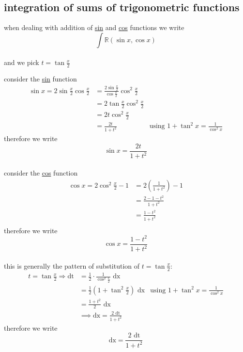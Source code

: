 \documentclass[a4paper,12pt]{article}
\newcommand{\?}{\stackrel{?}{=}}
\begin{document}
\subsection{integration of sums of trigonometric functions}
\label{sec:org50d9a5a}
\begin{definition}
\begin{note}
when dealing with addition of \hyperref[sec:org53499b5]{sin} and \hyperref[sec:org65fe77c]{cos} functions we write\\[0pt]
\[
  \int \mathbb{R}(\sin x, \cos x)
\]\\[0pt]
and we pick \(\boxed{t = \tan \frac{x}{2}}\)\\[0pt]
\end{note}
consider the \hyperref[sec:org53499b5]{sin} function\\[0pt]
\begin{align*}
  \sin x = 2\sin\frac{x}{2} \cos\frac{x}{2} &= \frac{2\sin\frac{x}{2}}{\cos\frac{x}{2}} \cos^2\frac{x}{2}\\
  &= 2\tan\frac{x}{2} \cos^2\frac{x}{2}\\
  &= 2t\cos^2\frac{x}{2}\\
  &= \frac{2t}{1 + t^2} &\text{using } 1 + \tan^2 x = \frac{1}{\cos^2 x}
\end{align*}
therefore we write\\[0pt]
\[
  \boxed{\sin x = \frac{2t}{1 + t^2}}
\]\\[0pt]
consider the \hyperref[sec:org65fe77c]{cos} function\\[0pt]
\begin{align*}
  \cos x = 2\cos^2 \frac{x}{2} - 1 &= 2\left(\frac{1}{1 + t^2}\right) - 1\\
  &= \frac{2 - 1 - t^2}{1 + t^2}\\
  &= \frac{1 - t^2}{1 + t^2}\\
\end{align*}
therefore we write\\[0pt]
\[
  \boxed{\cos x = \frac{1 - t^2}{1 + t^2}}
\]\\[0pt]
this is generally the pattern of substitution of \(t = \tan \frac{x}{2}\):\\[0pt]
\begin{align*}
  t = \tan \frac{x}{2} \Rightarrow \text{dt} &= \frac12 \cdot \frac{1}{\cos^2 \frac{x}{2}} \text{ dx}\\
  &= \frac12\left(1 + \tan^2 \frac{x}{2}\right) \text{ dx} &\text{using } 1 + \tan^2 x = \frac{1}{\cos^2 x}\\
  &= \frac{1 + t^2}{2} \text{ dx}\\
  &\implies \text{dx} = \frac{2 \text{ dt}}{1 + t^2}
\end{align*}
therefore we write\\[0pt]
\[
  \boxed{\text{dx} = \frac{2 \text{ dt}}{1 + t^2}}
\]\\[0pt]


\end{definition}
\end{document}
